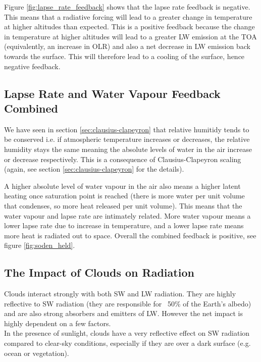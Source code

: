 Figure \ref{fig:lapse_rate_feedback} shows that the lapse rate feedback is negative. This means that a radiative forcing
will lead to a greater change in temperature at higher altitudes than expected. This is a positive feedback because
the change in temperature at higher altitudes will lead to a greater \gls{LW} emission at the \gls{TOA} (equivalently,
an increase in \gls{OLR}) and also a net decrease in \gls{LW} emission back towards the surface. This will therefore 
lead to a cooling of the surface, hence negative feedback.

\subsection{Lapse Rate and Water Vapour Feedback Combined}
\label{sec:lapse_rate_water_vapour_feedback}

We have seen in section \ref{sec:clausius-clapeyron} that relative humitidy tends to be conserved i.e. if atmospheric
temperature increases or decreases, the relative humidity stays the same meaning the absolute levels of water in the air
increase or decrease respectively. This is a consequence of Clausius-Clapeyron scaling (again, see section 
\ref{sec:clausius-clapeyron} for the details).

A higher absolute level of water vapour in the air also means a higher latent heating once saturation point is reached 
(there is more water per unit volume that condenses, so more heat released per unit volume). This means that the 
water vapour and lapse rate are intimately related. More water vapour means a lower lapse rate due to increase in 
temperature, and a lower lapse rate means more heat is radiated out to space. Overall the combined feedback is positive,
see figure \ref{fig:soden_held}.

\subsection{The Impact of Clouds on Radiation}
\label{sec:clouds_radiation}

Clouds interact strongly with both \gls{SW} and \gls{LW} radiation. They are highly reflective to \gls{SW} radiation
(they are responsible for ~50\% of the Earth's \gls{albedo}) and are also strong absorbers and emitters of \gls{LW}. 
However the net impact is highly dependent on a few factors.\\

In the presence of sunlight, clouds have a very reflective effect on \gls{SW} radiation compared to clear-sky conditions,
especially if they are over a dark surface (e.g. ocean or vegetation). 

